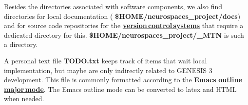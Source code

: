 \documentclass[12pt]{article}
\begin{document}
Besides the directories associated with software components, we also
find directories for local documentation ({\bf
  \$HOME/neurospaces\_project/docs}) and for source code repositories
for the \href{../version-control/version-control.tex}{\bf version\,control\,systems} 
that require a dedicated directory for this.  {\bf
  \$HOME/neurospaces\_project/\_MTN} is such a directory.

A personal text file {\bf TODO.txt} keeps track of items that wait
local implementation, but maybe are only indirectly related to GENESIS
3 development.  This file is commonly formatted according to the
\href{http://www.gnu.org/software/emacs/}{\bf Emacs}
\href{http://www.emacswiki.org/emacs/OutlineMode}{\bf outline\,major\,mode}.
The Emacs outline mode can be converted to latex and HTML when needed.
\end{document}
